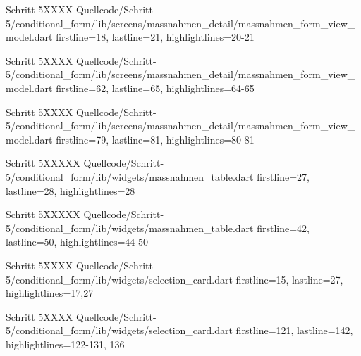   \begin{alexlisting}{Schritt 5}{XXXX}
    {Quellcode/Schritt-5/conditional_form/lib/screens/massnahmen_detail/massnahmen_form_view_model.dart}
    {firstline=18, lastline=21, highlightlines={20-21}}
    \label{lst:Schritt5XXXXX}
  \end{alexlisting}

  \begin{alexlisting}{Schritt 5}{XXXX}
    {Quellcode/Schritt-5/conditional_form/lib/screens/massnahmen_detail/massnahmen_form_view_model.dart}
    {firstline=62, lastline=65, highlightlines={64-65}}
    \label{lst:Schritt5XXXXX}
  \end{alexlisting}

  \begin{alexlisting}{Schritt 5}{XXXX}
    {Quellcode/Schritt-5/conditional_form/lib/screens/massnahmen_detail/massnahmen_form_view_model.dart}
    {firstline=79, lastline=81, highlightlines={80-81}}
    \label{lst:Schritt5XXXXX}
  \end{alexlisting}

  \begin{alexlisting}{Schritt 5}{XXXXX}
    {Quellcode/Schritt-5/conditional_form/lib/widgets/massnahmen_table.dart}
    {firstline=27, lastline=28, highlightlines={28}}
    \label{lst:Schritt5XXXXX}
  \end{alexlisting}

  \begin{alexlisting}{Schritt 5}{XXXXX}
    {Quellcode/Schritt-5/conditional_form/lib/widgets/massnahmen_table.dart}
    {firstline=42, lastline=50, highlightlines={44-50}}
    \label{lst:Schritt5XXXXX}
  \end{alexlisting}

  \begin{alexlisting}{Schritt 5}{XXXX}
    {Quellcode/Schritt-5/conditional_form/lib/widgets/selection_card.dart}
    {firstline=15, lastline=27, highlightlines={17,27}}
    \label{lst:Schritt5XXXX}
\end{alexlisting}

\begin{alexlisting}{Schritt 5}{XXXX}
    {Quellcode/Schritt-5/conditional_form/lib/widgets/selection_card.dart}
    {firstline=121, lastline=142, highlightlines={122-131, 136}}
    \label{lst:Schritt5XXXX}
\end{alexlisting}